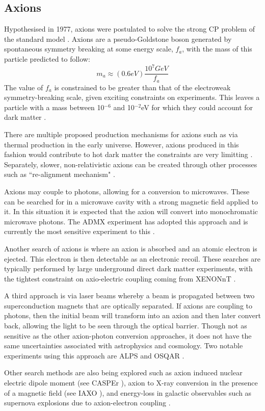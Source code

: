 \subsection{Axions}
\par
Hypothesised in 1977, axions were postulated to solve the strong CP problem of the standard model \cite{axion_origins_ref}.
Axions are a pseudo-Goldstone boson generated by spontaneous symmetry breaking at some energy scale, $f_a$, with the mass of this particle predicted to follow:
\begin{equation}
    m_a \approx (0.6eV)\frac{10^7 GeV}{f_a}
\end{equation}
The value of $f_a$ is constrained to be greater than that of the electroweak symmetry-breaking scale, given exciting constraints on experiments.
This leaves a particle with a mass between 10${}^{-6}$ and 10${}^{-2}$eV for which they could account for dark matter \cite{axions_ref}.
\par
There are multiple proposed production mechanisms for axions such as via thermal production in the early universe.
However, axions produced in this fashion would contribute to hot dark matter the constraints are very limitting \cite{hot_axions_ref}.
Separately, slower, non-relativistic axions can be created through other processes such as ``re-alignment mechanism" \cite{cold_axion_ref}.
\par
Axions may couple to photons, allowing for a conversion to microwaves.
These can be searched for in a microwave cavity with a strong magnetic field applied to it.
In this situation it is expected that the axion will convert into monochromatic microwave photons.
The ADMX experiment has adopted this approach and is currently the most sensitive experiment to this \cite{admx_experiment_ref}.
\par
Another search of axions is where an axion is absorbed and an atomic electron is ejected.
This electron is then detectable as an electronic recoil.
These searches are typically performed by large underground direct dark matter experiments, with the tightest constraint on axio-electric coupling coming from XENONnT \cite{xenonnt_sr1_er_ref}.
\par
A third approach is via laser beams whereby a beam is propagated between two superconduction magnets that are optically separated.
If axions are coupling to photons, then the initial beam will transform into an axion and then later convert back, allowing the light to be seen through the optical barrier.
Though not as sensitive as the other axion-photon conversion approaches, it does not have the same uncertainties associated with astrophysics and cosmology.
Two notable experiments using this approach are ALPS \cite{alps_axion_result_ref} and OSQAR \cite{osqar_axion_result_ref}. 
\par
Other search methods are also being explored such as axion induced nuclear electric dipole moment (see CASPEr \cite{casper_experiment_ref}), axion to X-ray conversion in the presence of a magnetic field (see IAXO \cite{iaxo_experiment_ref}), and energy-loss in galactic observables such as supernova explosions due to axion-electron coupling \cite{axions_from_supernova_ref}.

